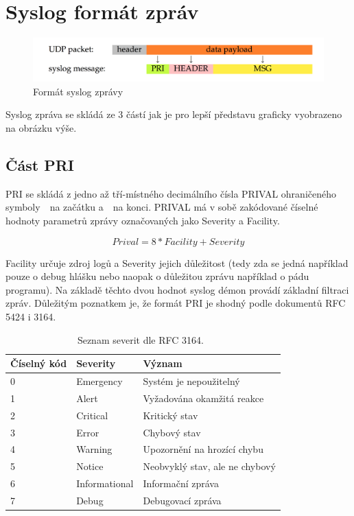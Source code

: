 \documentclass[thesis=B,czech]{FITthesis}[2012/06/26]
\begin{document}
\section{Syslog formát zpráv}
\begin{figure}[H]
	\centering
	\includegraphics[scale=0.3]{images/syslog-message-format}
	\caption[Formát syslog zprávy]{Formát syslog zprávy}
\end{figure}

Syslog zpráva se skládá ze 3 částí jak je pro lepší představu graficky vyobrazeno na obrázku výše.

\subsection{Část PRI}
PRI se skládá z jedno až tří-místného decimálního čísla PRIVAL ohraničeného symboly~\uv{<}~na začátku a~\uv{>}~na konci.
PRIVAL má v sobě zakódované číselné hodnoty parametrů zprávy označovaných jako Severity a Facility.


$$Prival= 8*Facility+Severity$$


Facility určuje zdroj logů a Severity jejich důležitost (tedy zda se jedná například pouze o debug hlášku nebo naopak o důležitou zprávu například o pádu programu). Na základě těchto dvou hodnot syslog démon provádí základní filtraci zpráv.
Důležitým poznatkem je, že formát PRI je shodný podle dokumentů RFC 5424 i 3164.

\begin{table}[ht]
\centering
	\caption[Tabulka severit podle RFC 3164]{Seznam severit dle RFC 3164.~\cite{RFC3164}}
	\begin{tabular}{|l|l|l|}\hline
		Číselný kód	& Severity & Význam	\tabularnewline \hline \hline
		0		& Emergency	&	Systém je nepoužitelný \tabularnewline \hline
		1		& Alert		&	Vyžadována okamžitá reakce \tabularnewline \hline
		2		& Critical	&	Kritický stav \tabularnewline \hline
		3		& Error		&	Chybový stav	\tabularnewline \hline
		4		& Warning	&	Upozornění na hrozící chybu \tabularnewline \hline
		5		& Notice		&	Neobvyklý stav, ale ne chybový \tabularnewline \hline
		6		& Informational & Informační zpráva \tabularnewline \hline
		7		& Debug		&	Debugovací zpráva \tabularnewline \hline
	\end{tabular}
\end{table}
\end{document}

